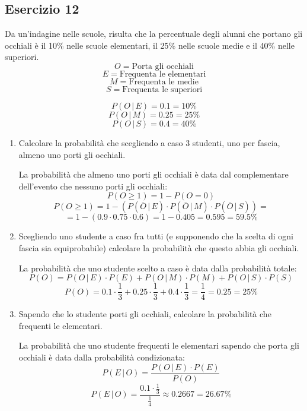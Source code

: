 \documentclass[a4paper]{article}
\theoremstyle{break}
\theoremstyle{break}
\theoremstyle{break}
\theoremstyle{break}
\begin{document}
\subsection{Esercizio 12}
Da un'indagine nelle scuole, risulta che la percentuale degli alunni che portano gli
occhiali è il 10\% nelle scuole elementari, il 25\% nelle scuole medie e il 40\% nelle 
superiori.
\[
  O = \text{Porta gli occhiali}
\] 
\[
  E = \text{Frequenta le elementari}
\] 
\[
  M = \text{Frequenta le medie}
\] 
\[
  S = \text{Frequenta le superiori}
\] 

\[
  P(O\,|\,E) = 0.1 = 10\% 
\] 
\[
  P(O\,|\,M) = 0.25 = 25\%
\] 
\[
  P(O\,|\,S) = 0.4 = 40\%
\] 
\begin{enumerate}
  \item Calcolare la probabilità che scegliendo a caso 3 studenti, uno per fascia, almeno
    uno porti gli occhiali.

    \vspace{1em}
    La probabilità che almeno uno porti gli occhiali è data dal complementare dell'evento
    che nessuno porti gli occhiali:
    \[
      P(O \ge 1) = 1 - P(O = 0)
    \] 
    \[
      P(O \ge 1) = 1 - \left( P(\overline{O}\,|\,E) \cdot P(\overline{O}\,|\,M) \cdot P(\overline{O}\,|\,S) \right) =
    \] 
    \[
      = 1 - \left( 0.9 \cdot 0.75 \cdot 0.6 \right) = 1 - 0.405 = 0.595 = 59.5\%
    \] 
  \item Scegliendo uno studente a caso fra tutti (e supponendo che la scelta di ogni 
    fascia sia equiprobabile) calcolare la probabilità che questo abbia gli occhiali.
    
    \vspace{1em}
    La probabilità che uno studente scelto a caso è data dalla probabilità totale:
    \[
      P(O) = P(O\,|\,E) \cdot P(E) + P(O\,|\,M) \cdot P(M) + P(O\,|\,S) \cdot P(S)
    \] 
    \[
      P(O) = 0.1 \cdot \frac{1}{3} + 0.25 \cdot \frac{1}{3} + 0.4 \cdot \frac{1}{3} = \frac{1}{4} = 0.25 = 25\%
    \] 
  \item Sapendo che lo studente porti gli occhiali, calcolare la probabilità che 
    frequenti le elementari.

    \vspace{1em}
    \noindent La probabilità che uno studente frequenti le elementari sapendo che porta
    gli occhiali è data dalla probabilità condizionata:
    \[
    P(E\,|\,O) = \frac{P(O\,|\,E) \cdot P(E)}{P(O)}
    \] 
    \[
      P(E\,|\,O) = \frac{0.1 \cdot \frac{1}{3}}{\frac{1}{4}} \approx 0.2667 = 26.67\%
    \] 
\end{enumerate}
\end{document}
